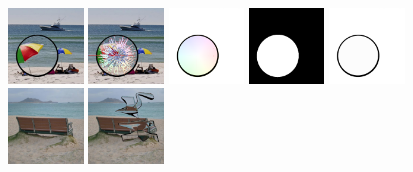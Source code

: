      \includegraphics[width=0.15\textwidth]{ch-tomnet/images/Dataset/render_gt_shape0160_COCO_val2014_000000391596}
     \includegraphics[width=0.15\textwidth]{ch-tomnet/images/Dataset/render_gt_shape0160_COCO_val2014_000000391596_cores}
     \includegraphics[width=0.15\textwidth]{ch-tomnet/images/Dataset/render_gt_shape0160_COCO_val2014_000000391596_flow}
     \includegraphics[width=0.15\textwidth]{ch-tomnet/images/Dataset/render_gt_shape0160_COCO_val2014_000000391596_mask}
     \includegraphics[width=0.15\textwidth]{ch-tomnet/images/Dataset/render_gt_shape0160_COCO_val2014_000000391596_rho}
     \\
     \includegraphics[width=0.15\textwidth]{ch-tomnet/images/Dataset/render_gt_shape0040_COCO_val2014_000000028826_ref}
     \includegraphics[width=0.15\textwidth]{ch-tomnet/images/Dataset/render_gt_shape0040_COCO_val2014_000000028826}
